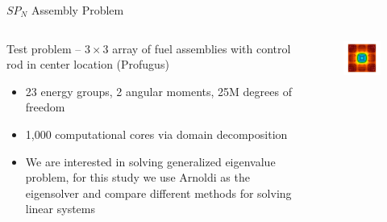 \documentclass{beamer}
\begin{document}
\begin{frame}{$SP_N$ Assembly Problem}
\small
  \begin{columns}
    \begin{column}{0.4\textwidth}
      Test problem -- $3 \times 3$ array of fuel assemblies with
      control rod in center location (Profugus)
      \begin{itemize}
      \item 23 energy groups, 2 angular moments, 25M degrees of freedom
      \item 1,000 computational cores via domain decomposition
      \item We are interested in solving generalized eigenvalue problem,
        for this study we use Arnoldi as the eigensolver and compare
        different methods for solving linear systems
      \end{itemize}
    \end{column}
    \begin{column}{0.6\textwidth}
      \vspace*{-0.5in}
      \begin{figure}
        \centering
        \includegraphics[width=3in]{prob4}
      \end{figure}
    \end{column}
  \end{columns}

\end{frame}
\end{document}
